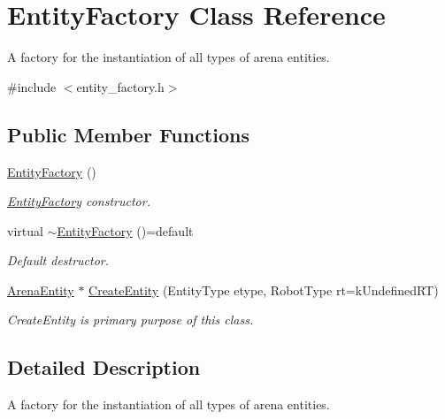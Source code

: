\hypertarget{class_entity_factory}{}\section{Entity\+Factory Class Reference}
\label{class_entity_factory}


A factory for the instantiation of all types of arena entities.  




{\ttfamily \#include $<$entity\+\_\+factory.\+h$>$}

\subsection*{Public Member Functions}
\begin{DoxyCompactItemize}
\item 
\hyperlink{class_entity_factory_abaf0c4ceaa682e55f69b0ceae230008a}{Entity\+Factory} ()\hypertarget{class_entity_factory_abaf0c4ceaa682e55f69b0ceae230008a}{}\label{class_entity_factory_abaf0c4ceaa682e55f69b0ceae230008a}

\begin{DoxyCompactList}\small\item\em \hyperlink{class_entity_factory}{Entity\+Factory} constructor. \end{DoxyCompactList}\item 
virtual \hyperlink{class_entity_factory_ae3246f06fa101178803f76582323d4ad}{$\sim$\+Entity\+Factory} ()=default\hypertarget{class_entity_factory_ae3246f06fa101178803f76582323d4ad}{}\label{class_entity_factory_ae3246f06fa101178803f76582323d4ad}

\begin{DoxyCompactList}\small\item\em Default destructor. \end{DoxyCompactList}\item 
\hyperlink{class_arena_entity}{Arena\+Entity} $\ast$ \hyperlink{class_entity_factory_a2a41674ef60c634ef8f886ead99b7b12}{Create\+Entity} (Entity\+Type etype, Robot\+Type rt=k\+Undefined\+RT)
\begin{DoxyCompactList}\small\item\em Create\+Entity is primary purpose of this class. \end{DoxyCompactList}\end{DoxyCompactItemize}


\subsection{Detailed Description}
A factory for the instantiation of all types of arena entities. 


